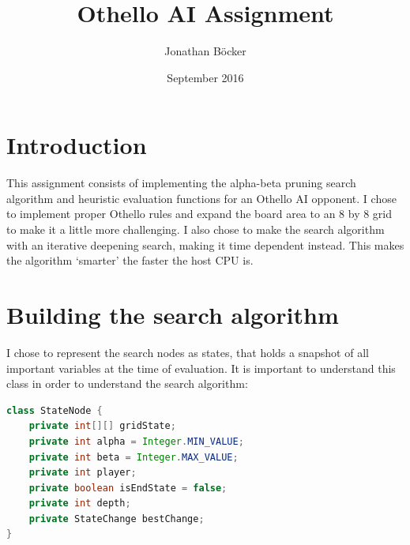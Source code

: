 \documentclass{article}
\title{Othello AI Assignment}
\author{Jonathan Böcker}
\date{September 2016}
\begin{document}
\maketitle

\section{Introduction}

This assignment consists of implementing the alpha-beta pruning search algorithm \citep{russel2010artifical}
and heuristic evaluation functions for an Othello AI opponent. I chose to implement
proper Othello rules and expand the board area to an 8 by 8 grid to make it a little
more challenging. I also chose to make the search algorithm with an iterative deepening search,
making it time dependent instead.
This makes the algorithm `smarter' the faster the host CPU is.

\section{Building the search algorithm}

I chose to represent the search nodes as states, that holds a snapshot of all important
variables at the time of evaluation. It is important to understand this class in order to understand
the search algorithm:

\begin{lstlisting}[language=Java]
class StateNode {
    private int[][] gridState;
    private int alpha = Integer.MIN_VALUE;
    private int beta = Integer.MAX_VALUE;
    private int player;
    private boolean isEndState = false;
    private int depth;
    private StateChange bestChange;
}
\end{lstlisting}
\end{document}
